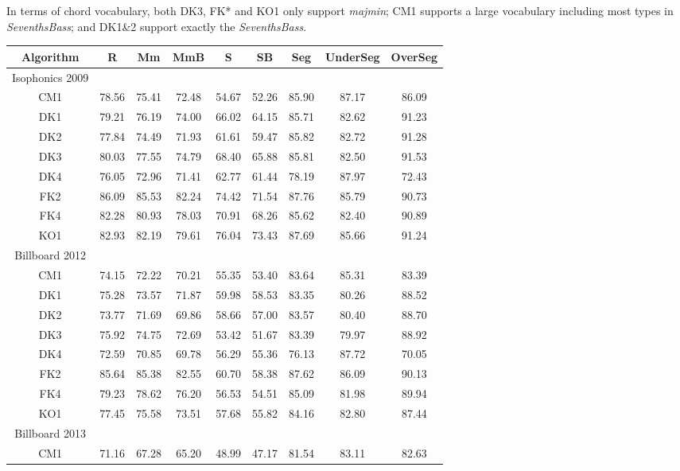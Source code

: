 In terms of chord vocabulary, both DK3, FK* and KO1 only support \textit{majmin}; CM1 supports a large vocabulary including most types in \textit{SeventhsBass}; and DK1\&2 support exactly the \textit{SeventhsBass}.
\thispagestyle{plain}
\begin{table*}[htbp]
\centering
\scriptsize
\begin{tabular}{|c|c|c|c|c|c|c|c|c|}\hline
Algorithm & R & Mm & MmB & S & SB & Seg & UnderSeg & OverSeg \\ \hline
Isophonics 2009\\ \hline
CM1 & 78.56 & 75.41 & 72.48 & 54.67 & 52.26 & 85.90 & 87.17 & 86.09\\ \hline
DK1 & 79.21 & 76.19 & 74.00 & 66.02 & 64.15 & 85.71 & 82.62 & 91.23\\ \hline
DK2 & 77.84 & 74.49 & 71.93 & 61.61 & 59.47 & 85.82 & 82.72 & 91.28\\ \hline
DK3 & 80.03 & 77.55 & 74.79 & 68.40 & 65.88 & 85.81 & 82.50 & 91.53\\ \hline
DK4 & 76.05 & 72.96 & 71.41 & 62.77 & 61.44 & 78.19 & 87.97 & 72.43\\ \hline
FK2 & 86.09 & 85.53 & 82.24 & 74.42 & 71.54 & 87.76 & 85.79 & 90.73\\ \hline
FK4 & 82.28 & 80.93 & 78.03 & 70.91 & 68.26 & 85.62 & 82.40 & 90.89\\ \hline
KO1 & 82.93 & 82.19 & 79.61 & 76.04 & 73.43 & 87.69 & 85.66 & 91.24\\ \hline
Billboard 2012 \\ \hline
CM1 & 74.15 & 72.22 & 70.21 & 55.35 & 53.40 & 83.64 & 85.31 & 83.39\\ \hline
DK1 & 75.28 & 73.57 & 71.87 & 59.98 & 58.53 & 83.35 & 80.26 & 88.52\\ \hline
DK2 & 73.77 & 71.69 & 69.86 & 58.66 & 57.00 & 83.57 & 80.40 & 88.70\\ \hline
DK3 & 75.92 & 74.75 & 72.69 & 53.42 & 51.67 & 83.39 & 79.97 & 88.92\\ \hline
DK4 & 72.59 & 70.85 & 69.78 & 56.29 & 55.36 & 76.13 & 87.72 & 70.05\\ \hline
FK2 & 85.64 & 85.38 & 82.55 & 60.70 & 58.38 & 87.62 & 86.09 & 90.13\\ \hline
FK4 & 79.23 & 78.62 & 76.20 & 56.53 & 54.51 & 85.09 & 81.98 & 89.94\\ \hline
KO1 & 77.45 & 75.58 & 73.51 & 57.68 & 55.82 & 84.16 & 82.80 & 87.44\\ \hline
Billboard 2013 \\ \hline
CM1 & 71.16 & 67.28 & 65.20 & 48.99 & 47.17 & 81.54 & 83.11 & 82.63\\ \hline

\end{tabular}
\end{table*}
